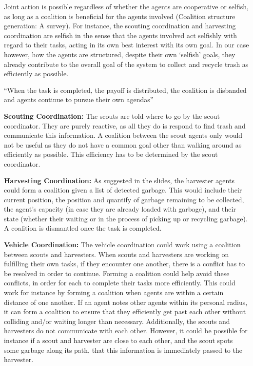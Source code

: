 Joint action is possible regardless of whether the agents are cooperative or selfish, as long as a coalition is beneficial for the agents involved (Coalition structure generation: A survey).  For instance, the scouting coordination and harvesting coordination are selfish in the sense that the agents involved act selfishly with regard to their tasks, acting in its own best interest with its own goal. In our case however, how the agents are structured, despite their own ‘selfish’ goals, they already contribute to the overall goal of the system to collect and recycle trash as efficiently as possible.
 
``When the task is completed, the payoff is distributed, the coalition is disbanded and agents continue to pursue their own agendas''

\textbf{Scouting Coordination:} The scouts are told where to go by the scout coordinator. They are purely reactive, as all they do is respond to find trash and communicate this information. A coalition between the scout agents only would not be useful as they do not have a common goal other than walking around as efficiently as possible. This efficiency has to be determined by the scout coordinator.  

\textbf{Harvesting Coordination:} As suggested in the slides, the harvester agents could form a coalition given a list of detected garbage. This would include their current position, the position and quantify of garbage remaining to be collected, the agent’s capacity (in case they are already loaded with garbage), and their state (whether their waiting or in the process of picking up or recycling garbage). A coalition is dismantled once the task is completed.

\textbf{Vehicle Coordination:} The vehicle coordination could work using a coalition between scouts and harvesters. When scouts and harvesters are working on fulfilling their own tasks, if they encounter one another, there is a conflict has to be resolved in order to continue. Forming a coalition could help avoid these conflicts, in order for each to complete their tasks more efficiently. This could work for instance by forming a coalition when agents are within a certain distance of one another. If an agent notes other agents within its personal radius, it can form a coalition to ensure that they efficiently get past each other without colliding and/or waiting longer than necessary. Additionally, the scouts and harvesters do not communicate with each other. However, it could be possible for instance if a scout and harvester are close to each other, and the scout spots some garbage along its path, that this information is immediately passed to the harvester. 

